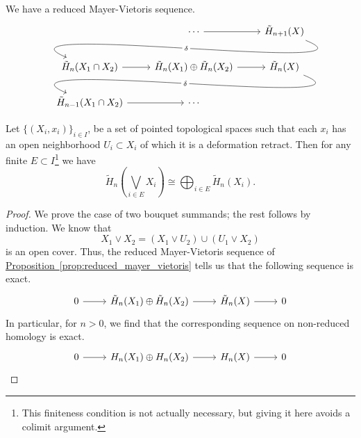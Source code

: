 \documentclass[main.tex]{subfiles}
\begin{document}
\begin{proposition}
  \label{prop:reduced_mayer_vietoris}
  We have a reduced Mayer-Vietoris sequence.
  \begin{equation*}
    \begin{tikzcd}
      & \cdots
      \arrow[r]
      & \tilde{H}_{n+1}(X)
      \\
      \tilde{H}_{n}(X_{1} \cap X_{2})
      \arrow[from=urr, out=-22, in=157, looseness=1, overlay, "\delta" description]
      \arrow[r]
      & \tilde{H}_{n}(X_{1}) \oplus \tilde{H}_{n}(X_{2})
      \arrow[r]
      & \tilde{H}_{n}(X)
      \\
      \tilde{H}_{n-1}(X_{1} \cap X_{2})
      \arrow[r]
      \arrow[from=urr, out=-22, in=157, looseness=1, overlay, "\delta" description]
      & \cdots
    \end{tikzcd}
  \end{equation*}
\end{proposition}

\begin{proposition}
  Let $\{(X_{i}, x_{i})\}_{i \in I}$, be a set of pointed topological spaces such that each $x_{i}$ has an open neighborhood $U_{i} \subset X_{i}$ of which it is a deformation retract. Then for any finite $E \subset I$\footnote{This finiteness condition is not actually necessary, but giving it here avoids a colimit argument.} we have
  \begin{equation*}
    \tilde{H}_{n}\left(\bigvee_{i \in E} X_{i}\right) \cong \bigoplus_{i \in E} \tilde{H}_{n}(X_{i}).
  \end{equation*}
\end{proposition}
\begin{proof}
  We prove the case of two bouquet summands; the rest follows by induction. We know that
  \begin{equation*}
    X_{1} \vee X_{2} = (X_{1} \vee U_{2}) \cup (U_{1} \vee X_{2})
  \end{equation*}
  is an open cover. Thus, the reduced Mayer-Vietoris sequence of \hyperref[prop:reduced_mayer_vietoris]{Proposition~\ref*{prop:reduced_mayer_vietoris}} tells us that the following sequence is exact.
  \begin{equation*}
    \begin{tikzcd}
      0
      \arrow[r]
      & \tilde{H}_{n}(X_{1}) \oplus \tilde{H}_{n}(X_{2})
      \arrow[r]
      & \tilde{H}_{n}(X)
      \arrow[r]
      & 0
    \end{tikzcd}
  \end{equation*}
  In particular, for $n > 0$, we find that the corresponding sequence on non-reduced homology is exact.
  \begin{equation*}
    \begin{tikzcd}
      0
      \arrow[r]
      & H_{n}(X_{1}) \oplus H_{n}(X_{2})
      \arrow[r]
      & H_{n}(X)
      \arrow[r]
      & 0
    \end{tikzcd}
  \end{equation*}
\end{proof}
\end{document}
